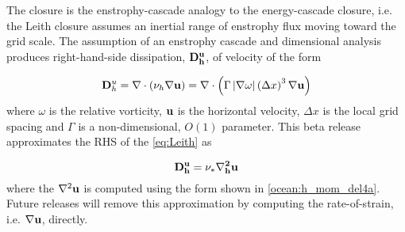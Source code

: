 The \cite{Leith:1996wu} closure is the enstrophy-cascade analogy to the \cite{Smagorinsky:1963wc} energy-cascade closure, i.e.  the Leith closure assumes an inertial range of enstrophy flux moving toward the grid scale. The assumption of an enstrophy cascade and dimensional analysis produces right-hand-side dissipation, $\bf{D}^u_h$, of velocity of the form

\begin{equation}
\label{eq:Leith}
{\bf D}^u_h =\nabla \cdot \left( \nu_h \nabla {\bf u} \right) = \nabla \cdot \left( \Gamma \left| \nabla \omega  \right| \left( \Delta x \right)^3 \nabla \bf{u} \right)
\end{equation}
where $\omega$ is the relative vorticity, ${\bf u}$ is the horizontal velocity, $\Delta x$ is the local grid spacing and $\Gamma$ is a non-dimensional, $O(1)$ parameter. This beta release approximates the RHS of the \ref{eq:Leith} as

\begin{equation}
\bf{D}^u_h=\nu_\ast \nabla_h^2 {\bf u}
\end{equation}
where the $\nabla^2 {\bf u}$ is computed using the form shown in \ref{ocean:h_mom_del4a}. Future releases will remove this approximation by computing the rate-of-strain, i.e. $\nabla {\bf u}$, directly.
